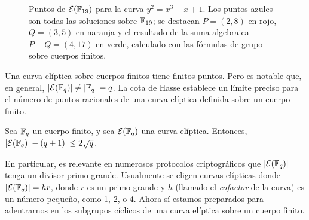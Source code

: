 \begin{figure}[!t]
	\centering
	\caption{Puntos de $\mathcal{E}(\mathbb{F}_{19})$ para la curva $y^2=x^3-x+1$. Los puntos azules son todas las soluciones sobre $\mathbb{F}_{19}$; se destacan $P=(2,8)$ en rojo, $Q=(3,5)$ en naranja y el resultado de la suma algebraica $P+Q=(4,17)$ en verde, calculado con las fórmulas de grupo sobre cuerpos finitos.}
	\label{fig:curva-eliptica-f19-suma}
\end{figure}

Una curva elíptica sobre cuerpos finitos tiene finitos puntos. Pero es notable que, en general, $|\mathcal{E}(\mathbb{F}_q)| \neq |\mathbb{F}_q| = q$. La cota de Hasse establece un límite preciso para el número de puntos racionales de una curva elíptica definida sobre un cuerpo finito.

\begin{theorem}
	Sea $\mathbb{F}_q$ un cuerpo finito, y sea $\mathcal{E}(\mathbb{F}_q)$ una curva elíptica. Entonces, $|\mathcal{E}(\mathbb{F}_q)| - (q + 1)| \leq 2\sqrt{q}$.
\end{theorem}

En particular, es relevante en numerosos protocolos criptográficos que $|\mathcal{E}(\mathbb{F}_q)|$ tenga un divisor primo grande. Usualmente se eligen curvas elípticas donde $|\mathcal{E}(\mathbb{F}_q)| = hr$, donde $r$ es un primo grande y $h$ (llamado el \textit{cofactor} de la curva) es un número pequeño, como 1, 2, o 4. Ahora sí estamos preparados para adentrarnos en los subgrupos cíclicos de una curva elíptica sobre un cuerpo finito.

